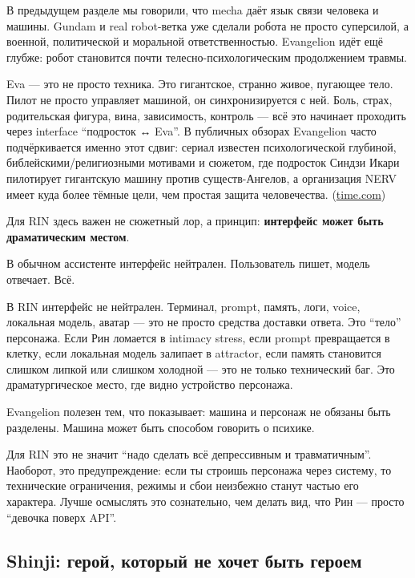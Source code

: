 В предыдущем разделе мы говорили, что mecha даёт язык связи человека и
машины. Gundam и real robot-ветка уже сделали робота не просто
суперсилой, а военной, политической и моральной ответственностью.
Evangelion идёт ещё глубже: робот становится почти
телесно-психологическим продолжением травмы.

Eva --- это не просто техника. Это гигантское, странно живое, пугающее
тело. Пилот не просто управляет машиной, он синхронизируется с ней.
Боль, страх, родительская фигура, вина, зависимость, контроль --- всё
это начинает проходить через interface ``подросток ↔ Eva''. В публичных
обзорах Evangelion часто подчёркивается именно этот сдвиг: сериал
известен психологической глубиной, библейскими/\hspace{0pt}религиозными мотивами и
сюжетом, где подросток Синдзи Икари пилотирует гигантскую машину против
существ-Ангелов, а организация NERV имеет куда более тёмные цели, чем
простая защита человечества.
(\href{https://time.com/6090247/neon-genesis-evangelion-thrice-upon-a-time-hideaki-anno/?utm_source=chatgpt.com}{time.com})

Для RIN здесь важен не сюжетный лор, а принцип: \textbf{интерфейс может
быть драматическим местом}.

В обычном ассистенте интерфейс нейтрален. Пользователь пишет, модель
отвечает. Всё.

В RIN интерфейс не нейтрален. Терминал, prompt, память, логи, voice,
локальная модель, аватар --- это не просто средства доставки ответа. Это
``тело'' персонажа. Если Рин ломается в intimacy stress, если prompt
превращается в клетку, если локальная модель залипает в attractor, если
память становится слишком липкой или слишком холодной --- это не только
технический баг. Это драматургическое место, где видно устройство
персонажа.

Evangelion полезен тем, что показывает: машина и персонаж не обязаны
быть разделены. Машина может быть способом говорить о психике.

Для RIN это не значит ``надо сделать всё депрессивным и травматичным''.
Наоборот, это предупреждение: если ты строишь персонажа через систему,
то технические ограничения, режимы и сбои неизбежно станут частью его
характера. Лучше осмыслять это сознательно, чем делать вид, что Рин ---
просто ``девочка поверх API''.

\subsection*{Shinji: герой, который не хочет быть героем}

